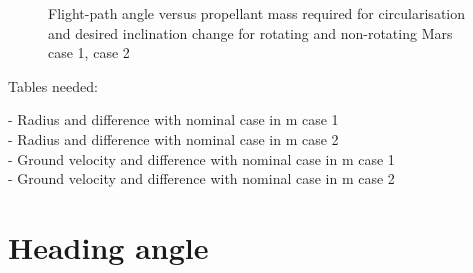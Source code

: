 \begin{figure}[H]
\centering
{} 
\caption{Flight-path angle versus propellant mass required for circularisation and desired inclination change for rotating and non-rotating Mars \protect{} case 1,  \protect{} case 2 } 
\label{fig:FPAvsPropellantMassCase1combined} 
\end{figure}



Tables needed:

- Radius and difference with nominal case in m case 1 \\
- Radius and difference with nominal case in m case 2 \\
- Ground velocity and difference with nominal case in m case 1 \\
- Ground velocity and difference with nominal case in m case 2 \\

\section{Heading angle}
\label{sec:headingAngle}


